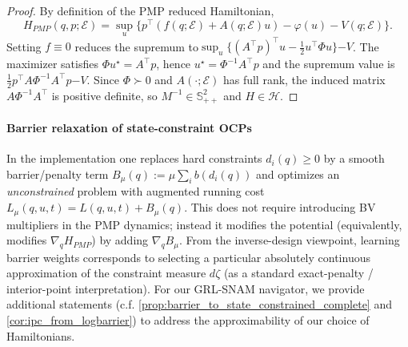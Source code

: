 \documentclass{article} %
\begin{document}
\begin{proof}
By definition of the PMP reduced Hamiltonian,
\[
H_{PMP}(q,p;\mathcal E)=\sup_{u}\Big\{p^\top(f(q;\mathcal E)+A(q;\mathcal E)u)-\varphi(u)- V(q;\mathcal E)\Big\}.
\]
Setting $f\equiv 0$ reduces the supremum to$\sup_u\{(A^\top p)^\top u-\tfrac12 u^\top \Phi u\}{-V}$.
The maximizer satisfies $\Phi u^\star=A^\top p$, hence $u^\star=\Phi^{-1}A^\top p$ and the supremum value is
$\tfrac12 p^\top A\Phi^{-1}A^\top p { - V}$. Since $\Phi\succ 0$ and $A(\cdot;\mathcal E)$ has full rank, the induced
matrix $A\Phi^{-1}A^\top$ is positive definite, so $M^{-1}\in\mathbb S_{++}^2$ and $H\in\mathscr H$.
\end{proof}
{
\paragraph{Barrier relaxation of state-constraint OCPs}\label{rem:barrier_relaxation}
In the implementation one replaces hard constraints $d_i(q)\ge 0$ by a smooth barrier/penalty term
$B_\mu(q):=\mu \sum_i b(d_i(q))$ and optimizes an \emph{unconstrained} problem with augmented running cost
$L_\mu(q,u,t)=L(q,u,t)+B_\mu(q)$.
This does not require introducing BV multipliers in the PMP dynamics; instead it modifies the potential (equivalently, modifies $\nabla_q H_{PMP}$) by adding $\nabla_q B_\mu$. From the inverse-design viewpoint, learning barrier weights corresponds to selecting a particular absolutely continuous approximation of the constraint measure $d\zeta$ (as a standard exact-penalty / interior-point interpretation). For our GRL-SNAM navigator, we provide additional statements (c.f. \cref{prop:barrier_to_state_constrained_complete} and \cref{cor:ipc_from_logbarrier}) to address the approximability of our choice of Hamiltonians.
}
\end{document}
